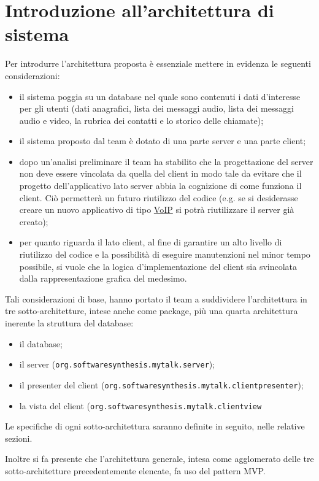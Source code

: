 \section{Introduzione all'architettura di sistema}\label{sec:introdesign}
Per introdurre l'architettura proposta è essenziale mettere in evidenza le seguenti considerazioni:
\begin{itemize}
	\item il sistema poggia su un database nel quale sono contenuti i dati d'interesse per gli utenti (dati anagrafici, lista dei messaggi audio, lista dei messaggi audio e video, la rubrica dei contatti e lo storico delle chiamate);
	\item il sistema proposto dal team è dotato di una parte server e una parte client;
	\item dopo un'analisi preliminare il team ha stabilito che la progettazione del server non deve essere vincolata da quella del client in modo tale da evitare che il progetto dell'applicativo lato server abbia la cognizione di come funziona il client. Ciò permetterà un futuro riutilizzo del codice (e.g. se si desiderasse creare un nuovo applicativo di tipo \underline{VoIP} si potrà riutilizzare il server già creato);
	\item per quanto riguarda il lato client, al fine di garantire un alto livello di riutilizzo del codice e la possibilità di eseguire manutenzioni nel minor tempo possibile, si vuole che la logica d'implementazione del client sia svincolata dalla rappresentazione grafica del medesimo.
\end{itemize}

Tali considerazioni di base, hanno portato il team a suddividere l'architettura in tre sotto-architetture, intese anche come package, più una quarta architettura inerente la struttura del database:
\begin{itemize}
	\item il database;
	\item il server (\texttt{org.softwaresynthesis.mytalk.server});
	\item il presenter del client (\texttt{org.softwaresynthesis.mytalk.clientpresenter});
	\item la vista del client (\texttt{org.softwaresynthesis.mytalk.clientview}
\end{itemize}

Le specifiche di ogni sotto-architettura saranno definite in seguito, nelle relative sezioni.

Inoltre si fa presente che l'architettura generale, intesa come agglomerato delle tre sotto-architetture precedentemente elencate, fa uso del pattern MVP\@.

